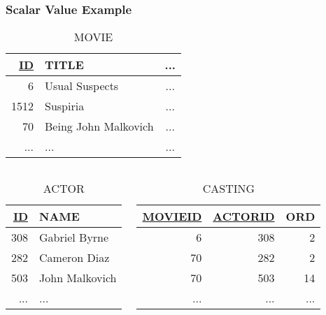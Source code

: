 \documentclass[dvipsnames]{beamer}
\theoremstyle{plain}
\begin{document}
\begin{frame}
  \frametitle{Scalar Value Example}

  \begin{example}
  \begin{tiny}
  \begin{table}
    \caption{MOVIE}
    \begin{tabular}{|r|l|c|}\hline
\underline{ID} & TITLE      & ...\\\hline\hline
   6 & Usual Suspects       & ...\\\hline
1512 & Suspiria             & ...\\\hline
  70 & Being John Malkovich & ...\\\hline
 ... & ...                  & ...\\\hline
    \end{tabular}
  \end{table}
  \end{tiny}

  \begin{columns}
    \begin{tiny}
      \begin{table}
        \caption{ACTOR}
        \begin{tabular}{|r|l|}\hline
\underline{ID} & NAME\\\hline\hline
308 & Gabriel Byrne  \\\hline
282 & Cameron Diaz   \\\hline
503 & John Malkovich \\\hline
... & ...            \\\hline
        \end{tabular}
      \end{table}
    \end{tiny}

    \begin{tiny}
    \begin{table}
      \caption{CASTING}
      \begin{tabular}{|r|r|r|}\hline
\underline{MOVIEID} & \underline{ACTORID} & ORD\\\hline\hline
  6 &  308 &   2\\\hline
 70 &  282 &   2\\\hline
 70 &  503 &  14\\\hline
... &  ... & ...\\\hline
      \end{tabular}
    \end{table}
    \end{tiny}
  \end{columns}
  \end{example}
\end{frame}
\end{document}
